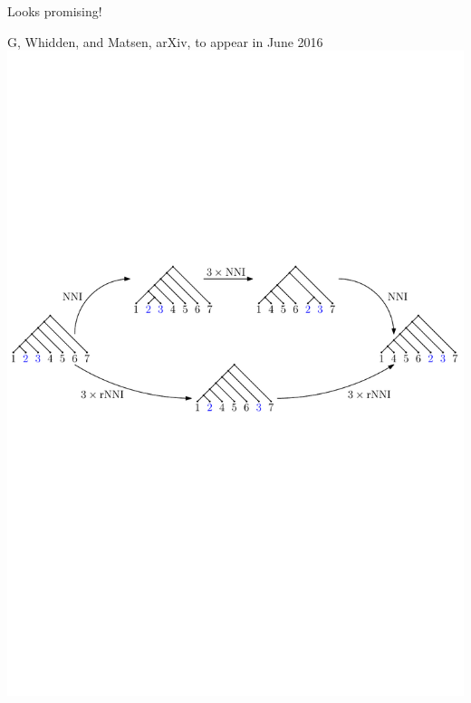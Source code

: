 \documentclass{beamer}
\theoremstyle{example}
\begin{document}
\begin{frame}{Looks promising!}
\begin{block}{G, Whidden, and Matsen, arXiv, to appear in June 2016}
\includegraphics[width = \framewidth]{NNI_VS_rNNI}
\end{block}
\end{frame}
\end{document}
